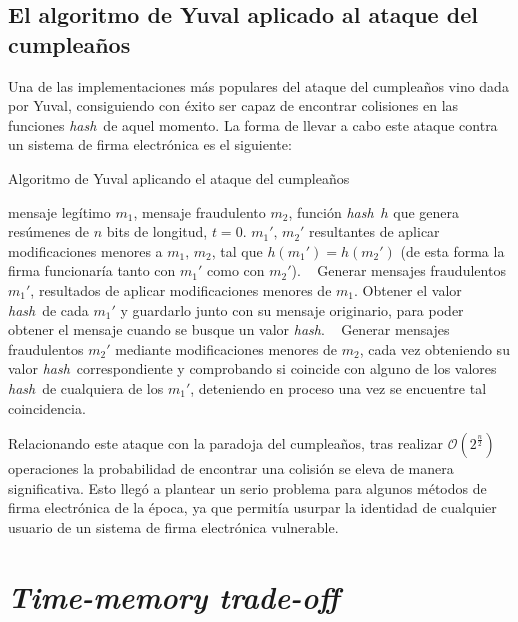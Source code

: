 \documentclass[12pt,spanish,listoffigures,listoftables,listofalgorithms]{tfgetsinf}
\newcommand{\hash}{\textit{hash}}
\begin{document}
\subsection{El algoritmo de Yuval aplicado al ataque del cumpleaños}

Una de las implementaciones más populares del ataque del cumpleaños vino dada por Yuval, consiguiendo con éxito ser capaz de encontrar colisiones en las funciones \hash~de aquel momento. La forma de llevar a cabo este ataque contra un sistema de firma electrónica es el siguiente:

\begin{algorithm}[H]
	\caption{Algoritmo de Yuval aplicando el ataque del cumpleaños}\label{Yuval}
	\begin{algorithmic}
		\REQUIRE mensaje legítimo $m_1$, mensaje fraudulento $m_2$, función \hash~$h$ que genera resúmenes de $n$ bits de longitud, $t = 0$.
		\ENSURE $m_1',\, m_2'$ resultantes de aplicar modificaciones menores a $m_1,\, m_2$, tal que $h(m_1') = h(m_2')$ (de esta forma la firma funcionaría tanto con $m_1'$ como con $m_2'$).
		\STATE ~
		\STATE Generar mensajes fraudulentos $m_1'$, resultados de aplicar modificaciones menores de $m_1$.
		\STATE Obtener el valor \hash~de cada $m_1'$ y guardarlo junto con su mensaje originario, para poder obtener el mensaje cuando se busque un valor \hash.
		\ENDWHILE
		\STATE ~
		\STATE Generar mensajes fraudulentos $m_2'$ mediante modificaciones menores de $m_2$, cada vez obteniendo su valor \hash~correspondiente y comprobando si coincide con alguno de los valores \hash~de cualquiera de los $m_1'$, deteniendo en proceso una vez se encuentre tal coincidencia.
		\ENDWHILE
	\end{algorithmic}
\end{algorithm}

Relacionando este ataque con la paradoja del cumpleaños, tras realizar $\mathcal{O}(2^{\frac{n}{2}})$ operaciones la probabilidad de encontrar una colisión se eleva de manera significativa. Esto llegó a plantear un serio problema para algunos métodos de firma electrónica de la época, ya que permitía usurpar la identidad de cualquier usuario de un sistema de firma electrónica vulnerable.

\section{\textit{Time-memory trade-off}} \label{tmto}
\end{document}
